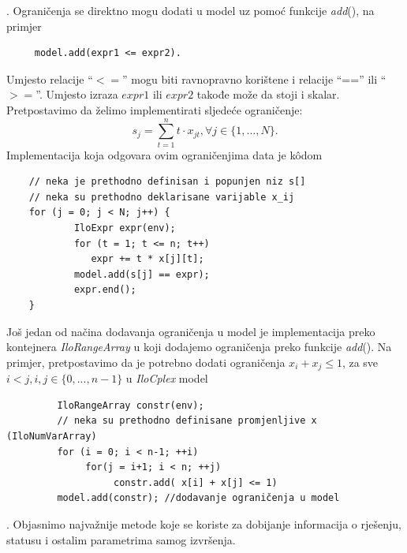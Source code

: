 \documentclass[a4paper, utf8, 11pt, colorlinks]{book}
\theoremstyle{definition}
\begin{document}
 . Ograničenja se direktno mogu dodati  u model uz pomoć funkcije \emph{add}(), na primjer
 \begin{verbatim}
 	 model.add(expr1 <= expr2).
 \end{verbatim} 	 
 	  Umjesto relacije ``$<=$'' mogu biti ravnopravno korištene i relacije ``=='' ili ``$>=$''. Umjesto izraza $expr1$ ili $expr2$ takođe može da stoji i skalar. Pretpostavimo da želimo implementirati sljedeće ograničenje:
 $$s_j = \sum_{t=1}^n t \cdot x_{jt}, \forall j \in \{1,\ldots,N\}.$$ 
 Implementacija koja odgovara ovim ograničenjima data je k\^odom
 \begin{verbatim}
 	// neka je prethodno definisan i popunjen niz s[]
 	// neka su prethodno deklarisane varijable x_ij
 	for (j = 0; j < N; j++) {
 		    IloExpr expr(env);
 		    for (t = 1; t <= n; t++)
 	  	       expr += t * x[j][t];            
 		    model.add(s[j] == expr);
 		    expr.end();
 	}
 \end{verbatim}
 Još jedan od načina dodavanja ograničenja u model je implementacija preko kontejnera \emph{IloRangeArray} u koji dodajemo ograničenja preko funkcije \emph{add}().   
 Na primjer, pretpostavimo da je potrebno dodati ograničenja $x_i + x_j \leq 1$, za sve $i<j, i,j \in \{0,...,n-1\}$ u \emph{IloCplex} model
 
 \begin{verbatim}
 	     IloRangeArray constr(env);
 	     // neka su prethodno definisane promjenljive x (IloNumVarArray) 
 	     for (i = 0; i < n-1; ++i)
 	          for(j = i+1; i < n; ++j)
 	               constr.add( x[i] + x[j] <= 1)     
      	 model.add(constr); //dodavanje ograničenja u model
 \end{verbatim}
 
 . Objasnimo najvažnije metode koje se koriste za dobijanje informacija o  rješenju, statusu i ostalim parametrima samog izvršenja.
  
\end{document}
